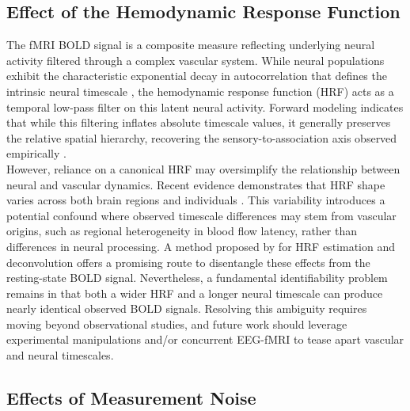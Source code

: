 \documentclass[9pt]{article}
\begin{document}
\subsection{Effect of the Hemodynamic Response Function}\label{sec:hrf}

The fMRI BOLD signal is a composite measure reflecting underlying neural activity filtered through a complex vascular system. While neural populations exhibit the characteristic exponential decay in autocorrelation that defines the intrinsic neural timescale \citep[Supplementary Mathematical Note]{murray_hierarchy_2014}, the hemodynamic response function (HRF) acts as a temporal low-pass filter on this latent neural activity. Forward modeling indicates that while this filtering inflates absolute timescale values, it generally preserves the relative spatial hierarchy, recovering the sensory-to-association axis observed empirically \citep{watanabe_atypical_2019}.\\

However, reliance on a canonical HRF may oversimplify the relationship between neural and vascular dynamics. Recent evidence demonstrates that HRF shape varies across both brain regions and individuals \citep{bailes_resting-state_2023, rangaprakash_hemodynamic_2018}. This variability introduces a potential confound where observed timescale differences may stem from vascular origins, such as regional heterogeneity in blood flow latency, rather than differences in neural processing. A method proposed by \citet{wu_rshrf_2021} for HRF estimation and deconvolution offers a promising route to disentangle these effects from the resting-state BOLD signal. Nevertheless, a fundamental identifiability problem remains in that both a wider HRF and a longer neural timescale can produce nearly identical observed BOLD signals. Resolving this ambiguity requires moving beyond observational studies, and future work should leverage experimental manipulations and/or concurrent EEG-fMRI to tease apart vascular and neural timescales.

\subsection{Effects of Measurement Noise}\label{sec:measurement-noise}
\end{document}
